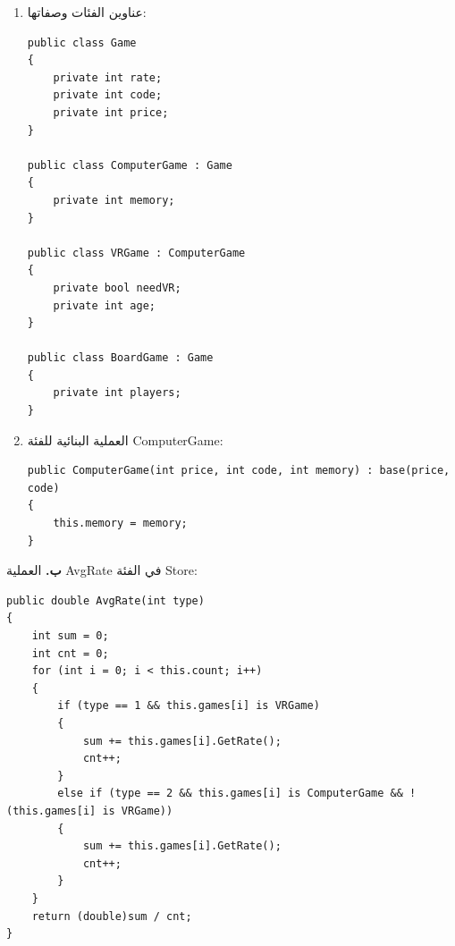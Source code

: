 \begin{boxSolution}
\begin{enumerate}[label=\textbf{(\arabic*)}, start=2, itemsep=0.5em]
    \item عناوين الفئات وصفاتها:
\begin{boxCode}
\begin{english}
\begin{verbatim}
public class Game
{
    private int rate;
    private int code;
    private int price;
}

public class ComputerGame : Game
{
    private int memory;
}

public class VRGame : ComputerGame
{
    private bool needVR;
    private int age;
}

public class BoardGame : Game
{
    private int players;
}
\end{verbatim}
\end{english}
\end{boxCode}

    \item العملية البنائية للفئة \textenglish{ComputerGame}:
\begin{boxCode}
\begin{english}
\begin{verbatim}
public ComputerGame(int price, int code, int memory) : base(price, code)
{
    this.memory = memory;
}
\end{verbatim}
\end{english}
\end{boxCode}
\end{enumerate}
\end{boxSolution}

\filbreak

\begin{boxSolution}
\textbf{ب.} العملية \textenglish{AvgRate} في الفئة \textenglish{Store}:
\begin{boxCode}
\begin{english}
\begin{verbatim}
public double AvgRate(int type)
{
    int sum = 0;
    int cnt = 0;
    for (int i = 0; i < this.count; i++)
    {
        if (type == 1 && this.games[i] is VRGame)
        {
            sum += this.games[i].GetRate();
            cnt++;
        }
        else if (type == 2 && this.games[i] is ComputerGame && !(this.games[i] is VRGame))
        {
            sum += this.games[i].GetRate();
            cnt++;
        }
    }
    return (double)sum / cnt;
}
\end{verbatim}
\end{english}
\end{boxCode}
\end{boxSolution}
\fi
\filbreak
